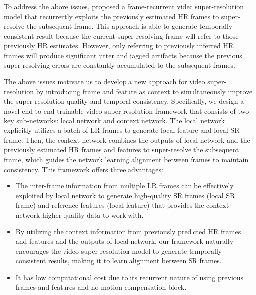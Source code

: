 \documentclass[letterpaper]{article} %
\begin{document}
To address the above issues, \cite{FRVSR2018cvpr} proposed a frame-recurrent video super-resolution model that recurrently exploits the previously estimated HR frames to super-resolve the subsequent frame. This approach is able to generate temporally consistent result because the current super-resolving frame will refer to those previously HR estimates. However, only referring to previously inferred HR frames will produce significant jitter and jagged artifacts because the previous super-resolving errors are constantly accumulated to the subsequent frames.

The above issues motivate us to develop a new approach for video super-resolution by introducing frame and feature as context to simultaneously improve the super-resolution quality and temporal consistency. Specifically, we design a novel end-to-end trainable video super-resolution framework that consists of two key sub-networks: local network and context network. The local network explicitly utilizes a batch of LR frames to generate local feature and local SR frame. Then, the context network combines the outputs of local network and the previously estimated HR frames and features to super-resolve the subsequent frame, which guides the network learning alignment between frames to maintain consistency. This framework offers three advantages:


\begin{itemize}
\item The inter-frame information from multiple LR frames can be effectively exploited by local network to generate high-quality SR frames (local SR frame) and reference features (local feature) that provides the context network higher-quality data to work with.
\item By utilizing the context information from previously predicted HR frames and features and the outputs of local network, our framework naturally encourages the video super-resolution model to generate temporally consistent results, making it to learn alignment between SR frames.
\item It has low computational cost due to its recurrent nature of using previous frames and features and no motion compensation block.
\end{itemize}
\end{document}
